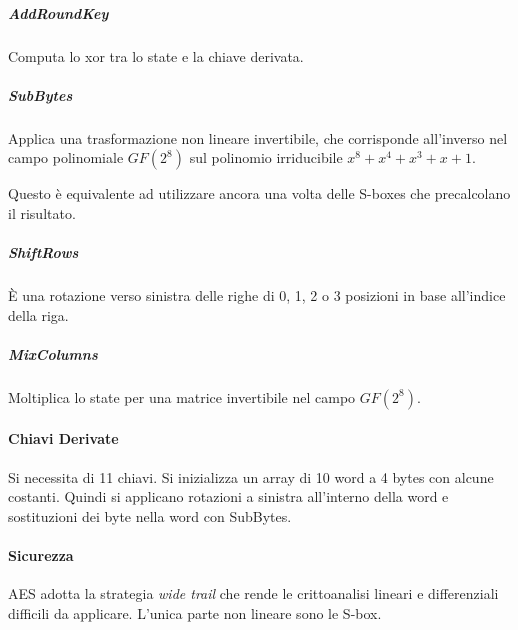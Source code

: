 \subparagraph{AddRoundKey}

Computa lo xor tra lo state e la chiave derivata.

\subparagraph{SubBytes}

Applica una trasformazione non lineare invertibile, che corrisponde all'inverso nel campo polinomiale $GF(2^8)$ sul polinomio irriducibile $x^8+x^4+x^3+x+1$.

Questo \`e equivalente ad utilizzare ancora una volta delle S-boxes che precalcolano il risultato.

\subparagraph{ShiftRows}

\`E una rotazione verso sinistra delle righe di 0, 1, 2 o 3 posizioni in base all'indice della riga.

\subparagraph{MixColumns}

Moltiplica lo state per una matrice invertibile nel campo $GF(2^8)$.

\paragraph{Chiavi Derivate}

Si necessita di 11 chiavi. Si inizializza un array di 10 word a 4 bytes con alcune costanti. Quindi si applicano rotazioni a sinistra all'interno della word e sostituzioni dei byte nella word con SubBytes.

\paragraph{Sicurezza}

AES adotta la strategia \textit{wide trail} che rende le crittoanalisi lineari e differenziali difficili da applicare. L'unica parte non lineare sono le S-box.
